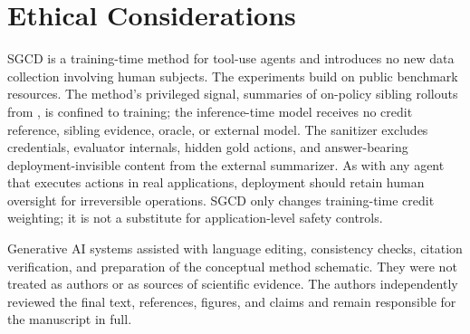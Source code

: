 \section*{Ethical Considerations}

SGCD is a training-time method for tool-use agents and introduces no new data
collection involving human subjects. The experiments build on public benchmark
resources. The method's
privileged signal, summaries of on-policy sibling rollouts from
\creditreferenceproviderphrase{}, is
confined to training; the inference-time model receives no credit reference, sibling
evidence, oracle, or external model. The sanitizer excludes credentials,
evaluator internals, hidden gold actions, and answer-bearing
deployment-invisible content from the external summarizer. As with any agent that executes actions in real
applications, deployment should retain human oversight for irreversible
operations. SGCD only changes training-time credit weighting; it is not a
substitute for application-level safety controls.

Generative AI systems assisted with language editing, consistency checks,
citation verification, and preparation of the conceptual method schematic.
They were not treated as authors or as sources of scientific evidence. The
authors independently reviewed the final text, references, figures, and claims
and remain responsible for the manuscript in full.
